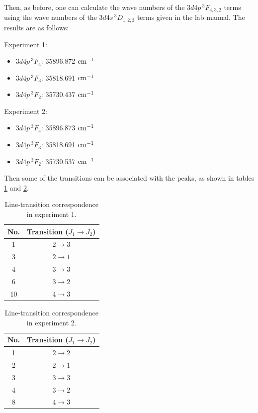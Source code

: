 \documentclass[a4paper]{article}
\begin{document}
Then, as before, one can calculate the wave numbers of the
$3d4p\,^3F_{4,3,2}$ terms using the wave numbers of the
$3d4s\,^3D_{1,2,3}$ terms given in the lab manual.  The results are
as follows:

Experiment 1:								
\begin{itemize}
\item $3d4p\,^3F_{4}$: 35896.872 $\rm cm^{-1}$	
\item $3d4p\,^3F_{3}$: 35818.691 $\rm cm^{-1}$	
\item $3d4p\,^3F_{2}$: 35730.437 $\rm cm^{-1}$	
\end{itemize}
Experiment 2:
\begin{itemize}							
\item $3d4p\,^3F_{4}$: 35896.873 $\rm cm^{-1}$	
\item $3d4p\,^3F_{3}$: 35818.691 $\rm cm^{-1}$	
\item $3d4p\,^3F_{2}$: 35730.537 $\rm cm^{-1}$	
\end{itemize}

Then some of the transitions can be associated with the peaks, as shown in tables \ref{tab:line-transition21} and \ref{tab:line-transition22}.
\begin{table}[htb!]
\centering
\begin{tabular}{c|c}
\hline
No. & Transition ($J_1 \to J_2$)\\
\hline
1 & $2 \to 3$ \\
3 & $2 \to 1$ \\
4 & $3 \to 3$ \\
6 & $3 \to 2$ \\
10 & $4 \to 3$\\
\hline
\end{tabular}
\caption{Line-transition correspondence in experiment 1.}
\label{tab:line-transition21}
\end{table}

\begin{table}[htb!]
\centering
\begin{tabular}{c|c}
\hline
No. & Transition ($J_1 \to J_2$)\\
\hline
1 & $2 \to 2$ \\
2 & $2 \to 1$ \\
3 & $3 \to 3$ \\
4 & $3 \to 2$ \\
8 & $4 \to 3$ \\
\hline
\end{tabular} 
\caption{Line-transition correspondence in experiment 2.}
\label{tab:line-transition22}
\end{table}
\end{document}
